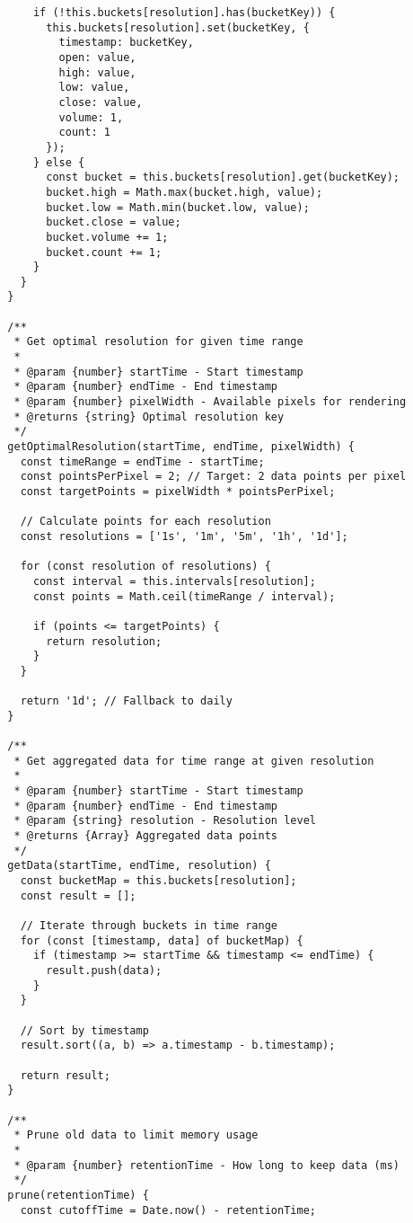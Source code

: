 \documentclass[11pt]{article}
\begin{document}
\begin{verbatim}
      if (!this.buckets[resolution].has(bucketKey)) {
        this.buckets[resolution].set(bucketKey, {
          timestamp: bucketKey,
          open: value,
          high: value,
          low: value,
          close: value,
          volume: 1,
          count: 1
        });
      } else {
        const bucket = this.buckets[resolution].get(bucketKey);
        bucket.high = Math.max(bucket.high, value);
        bucket.low = Math.min(bucket.low, value);
        bucket.close = value;
        bucket.volume += 1;
        bucket.count += 1;
      }
    }
  }
  
  /**
   * Get optimal resolution for given time range
   * 
   * @param {number} startTime - Start timestamp
   * @param {number} endTime - End timestamp
   * @param {number} pixelWidth - Available pixels for rendering
   * @returns {string} Optimal resolution key
   */
  getOptimalResolution(startTime, endTime, pixelWidth) {
    const timeRange = endTime - startTime;
    const pointsPerPixel = 2; // Target: 2 data points per pixel
    const targetPoints = pixelWidth * pointsPerPixel;
    
    // Calculate points for each resolution
    const resolutions = ['1s', '1m', '5m', '1h', '1d'];
    
    for (const resolution of resolutions) {
      const interval = this.intervals[resolution];
      const points = Math.ceil(timeRange / interval);
      
      if (points <= targetPoints) {
        return resolution;
      }
    }
    
    return '1d'; // Fallback to daily
  }
  
  /**
   * Get aggregated data for time range at given resolution
   * 
   * @param {number} startTime - Start timestamp
   * @param {number} endTime - End timestamp
   * @param {string} resolution - Resolution level
   * @returns {Array} Aggregated data points
   */
  getData(startTime, endTime, resolution) {
    const bucketMap = this.buckets[resolution];
    const result = [];
    
    // Iterate through buckets in time range
    for (const [timestamp, data] of bucketMap) {
      if (timestamp >= startTime && timestamp <= endTime) {
        result.push(data);
      }
    }
    
    // Sort by timestamp
    result.sort((a, b) => a.timestamp - b.timestamp);
    
    return result;
  }
  
  /**
   * Prune old data to limit memory usage
   * 
   * @param {number} retentionTime - How long to keep data (ms)
   */
  prune(retentionTime) {
    const cutoffTime = Date.now() - retentionTime;
    

\end{verbatim}
\end{document}
